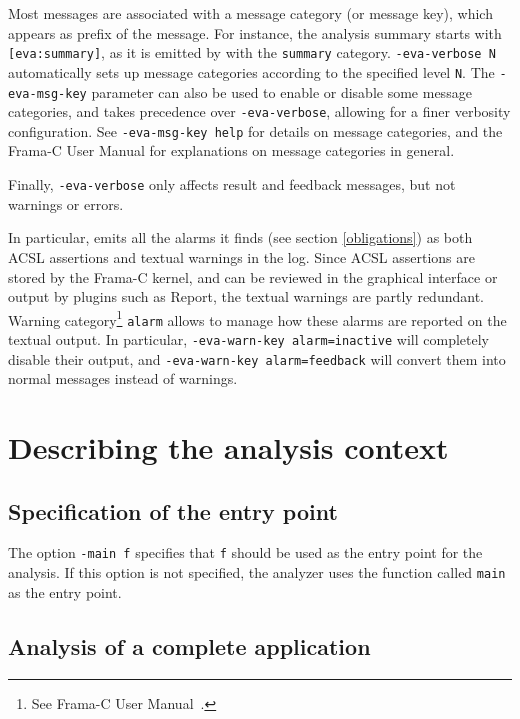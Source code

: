 \documentclass{frama-c-book}
\begin{document}
Most \Eva{} messages are associated with a message category (or message key),
which appears as prefix of the message. For instance, the analysis summary
starts with \texttt{[eva:summary]}, as it is emitted by \Eva{} with the
\texttt{summary} category.
\texttt{-eva-verbose N} automatically sets up message categories according to
the specified level \texttt{N}. The \texttt{-eva-msg-key} parameter can also be
used to enable or disable some message categories, and takes precedence over
\texttt{-eva-verbose}, allowing for a finer verbosity configuration.
See \texttt{-eva-msg-key help} for details on \Eva{} message categories,
and the Frama-C User Manual for explanations on message categories in general.

Finally, \texttt{-eva-verbose} only affects result and feedback messages, but
not warnings or errors.

In particular, \Eva{} emits all the alarms it finds (see section
\ref{obligations}) as both ACSL assertions and textual warnings in the
log. Since ACSL assertions are stored by the Frama-C kernel, and can be
reviewed in the graphical interface or output by plugins such as Report,
the textual warnings are partly redundant.
Warning category\footnote{See Frama-C User Manual~\cite{FCUserMan}.}
\texttt{alarm} allows to manage how these alarms are reported on the
textual output. In particular, \texttt{-eva-warn-key alarm=inactive} will
completely disable their output, and \texttt{-eva-warn-key alarm=feedback}
will convert them into normal messages instead of warnings.

\section{Describing the analysis context}
\label{context}

\subsection{Specification of the entry point}
\label{entry}

The option \lstinline|-main f| specifies that \lstinline|f| should be
used as the entry point for the analysis. If this option is
not specified, the analyzer uses the function called \lstinline|main|
as the entry point.

\subsection{Analysis of a complete application}
\label{complete}
\end{document}
